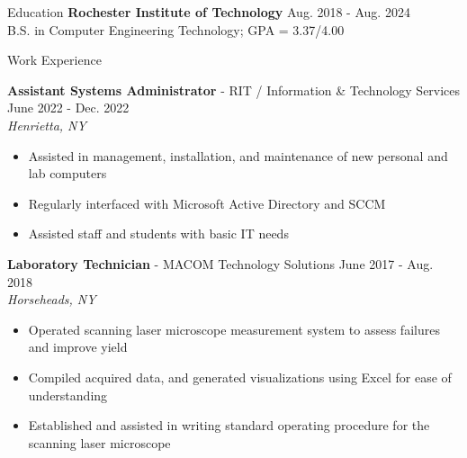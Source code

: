 \documentclass[UTF-8]{resume} \usepackage{multirow}
\begin{document}
\begin{rSection}{Education}
	{\bf Rochester Institute of Technology}  \hfill {Aug. 2018 - Aug. 2024}\\
	B.S. in Computer Engineering Technology; GPA = 3.37/4.00
\end{rSection}


        \begin{rSection}{Work Experience}
    	    \vspace{-1.6em}
		\item \textbf{Assistant Systems Administrator} {- RIT / Information \& Technology Services } \hfill {June 2022 - Dec. 2022}\\
            \emph{Henrietta, NY}
            \begin{itemize}
                \itemsep -5pt {}
                \item Assisted in management, installation, and maintenance of new personal and lab computers
                \item Regularly interfaced with Microsoft Active Directory and SCCM
                \item Assisted staff and students with basic IT needs
            \end{itemize}
        \item \textbf{Laboratory Technician} {- MACOM Technology Solutions} \hfill {June 2017 - Aug. 2018}\\
            \emph{Horseheads, NY}
            \begin{itemize}
                \itemsep -5pt {}
                \item Operated scanning laser microscope measurement system to assess failures and improve yield
                \item Compiled acquired data, and generated visualizations using Excel for ease of understanding
                \item Established and assisted in writing standard operating procedure for the scanning laser microscope
            \end{itemize}
        \end{rSection}
\end{document}
